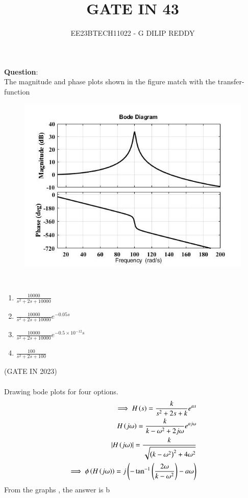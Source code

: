 \documentclass[journal,12pt,onecolumn]{IEEEtran}
\theoremstyle{remark}
\begin{document}

\vspace{3cm}

\title{GATE IN 43}
\author{EE23BTECH11022 - G DILIP REDDY}
\maketitle

\bigskip

\renewcommand{\thefigure}{\arabic{figure}}
\renewcommand{\thetable}{\arabic{table}}
\textbf{Question}:\\
The magnitude and phase plots shown in the figure match with the transfer-
function
\begin{figure}[h]
    \centering
    \includegraphics[width=\columnwidth]{figs/question.png}
\end{figure}\\
\renewcommand{\labelenumi}{\alph{enumi})}
\begin{enumerate}
\item $\frac{10000}{s^2+2s+10000}$\\
\item $\frac{10000}{s^2+2s+10000}e^{-0.05s}$\\
\item $\frac{10000}{s^2+2s+10000}e^{-0.5\times10^{-12}s}$\\
\item $\frac{100}{s^2+2s+100}$
\end{enumerate}
\hfill{(GATE IN 2023)}
\\\\
\solution
Drawing bode plots for four options.\\
\begin{align}
\implies H\left(s\right)=\frac{k}{s ^{2}+2s+k}e^{as}\\
H\left(j\omega\right)=\frac{k}{k-\omega ^2+2j\omega}e^{aj\omega}\\
\left\vert H\left(j\omega\right)\right\vert=\frac{k}{\sqrt{\left(k-\omega ^2\right)^2+4\omega^2}}\\
\implies \phi\left(H\left(j\omega\right)\right)=j\left(-\tan^{-1}{\left(\frac{2\omega}{k-\omega^2}\right)-a\omega}\right)
\end{align}
From the graphs , the answer is b
\end{document}

